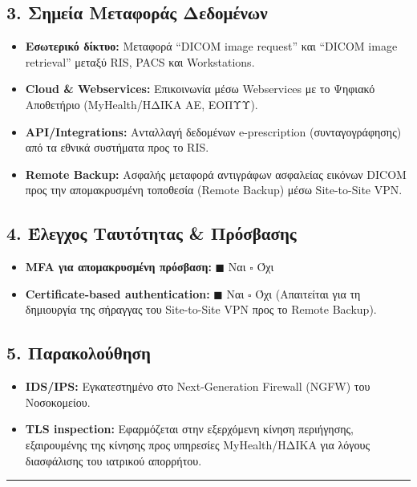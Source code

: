 \documentclass[11pt,a4paper]{article}
\begin{document}
\subsection*{3. Σημεία Μεταφοράς Δεδομένων}
\begin{itemize}
    \item \textbf{Εσωτερικό δίκτυο:} Μεταφορά ``DICOM image request'' και ``DICOM image retrieval'' μεταξύ RIS, PACS και Workstations.
    \item \textbf{Cloud \& Webservices:} Επικοινωνία μέσω Webservices με το Ψηφιακό Αποθετήριο (MyHealth/ΗΔΙΚΑ ΑΕ, ΕΟΠΥΥ).
    \item \textbf{API/Integrations:} Ανταλλαγή δεδομένων e-prescription (συνταγογράφησης) από τα εθνικά συστήματα προς το RIS.
    \item \textbf{Remote Backup:} Ασφαλής μεταφορά αντιγράφων ασφαλείας εικόνων DICOM προς την απομακρυσμένη τοποθεσία (Remote Backup) μέσω Site-to-Site VPN.
\end{itemize}

\subsection*{4. Έλεγχος Ταυτότητας \& Πρόσβασης}
\begin{itemize}
    \item \textbf{MFA για απομακρυσμένη πρόσβαση:} $\blacksquare$ Ναι \quad $\square$ Όχι
    \item \textbf{Certificate-based authentication:} $\blacksquare$ Ναι \quad $\square$ Όχι (Απαιτείται για τη δημιουργία της σήραγγας του Site-to-Site VPN προς το Remote Backup).
\end{itemize}

\subsection*{5. Παρακολούθηση}
\begin{itemize}
    \item \textbf{IDS/IPS:} Εγκατεστημένο στο Next-Generation Firewall (NGFW) του Νοσοκομείου.
    \item \textbf{TLS inspection:} Εφαρμόζεται στην εξερχόμενη κίνηση περιήγησης, εξαιρουμένης της κίνησης προς υπηρεσίες MyHealth/ΗΔΙΚΑ για λόγους διασφάλισης του ιατρικού απορρήτου.
\end{itemize}

\vspace{1cm}
\hrule
\vspace{1cm}
\end{document}
